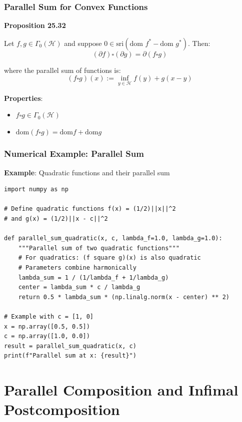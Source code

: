 \documentclass[aspectratio=169,10pt]{beamer}
\begin{document}
\begin{frame}
  \frametitle{Parallel Sum for Convex Functions}

  \textbf{Proposition 25.32}

  Let $f, g \in \Gamma_0(\mathcal{H})$ and suppose $0 \in \text{sri}(\text{dom } f^* - \text{dom } g^*)$. Then:
  $$(\partial f) \square (\partial g) = \partial(f \square g)$$

  where the parallel sum of functions is:
  $$(f \square g)(x) := \inf_{y \in \mathcal{H}} f(y) + g(x - y)$$

  \vspace{0.3cm}

  \textbf{Properties}:
  \begin{itemize}
    \item $f \square g \in \Gamma_0(\mathcal{H})$
    \item $\text{dom}(f \square g) = \text{dom} f + \text{dom} g$
  \end{itemize}

\end{frame}

\begin{frame}[fragile]
  \frametitle{Numerical Example: Parallel Sum}

  \textbf{Example}: Quadratic functions and their parallel sum

  \begin{lstlisting}
import numpy as np

# Define quadratic functions f(x) = (1/2)||x||^2
# and g(x) = (1/2)||x - c||^2

def parallel_sum_quadratic(x, c, lambda_f=1.0, lambda_g=1.0):
    """Parallel sum of two quadratic functions"""
    # For quadratics: (f square g)(x) is also quadratic
    # Parameters combine harmonically
    lambda_sum = 1 / (1/lambda_f + 1/lambda_g)
    center = lambda_sum * c / lambda_g
    return 0.5 * lambda_sum * (np.linalg.norm(x - center) ** 2)

# Example with c = [1, 0]
x = np.array([0.5, 0.5])
c = np.array([1.0, 0.0])
result = parallel_sum_quadratic(x, c)
print(f"Parallel sum at x: {result}")
  \end{lstlisting}

\end{frame}

\section{Parallel Composition and Infimal Postcomposition}
\end{document}

